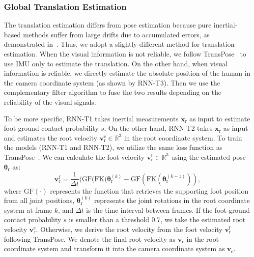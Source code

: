 \documentclass[sigconf,nonacm=true]{acmart}
\begin{document}
\subsubsection{Global Translation Estimation}\label{subsubsec:Tran}
The translation estimation differs from pose estimation because pure inertial-based methods suffer from large drifts due to accumulated errors, as demonstrated in~\cite{EgoLocate}.
Thus, we adopt a slightly different method for translation estimation.
When the visual information is not reliable, we follow TransPose~\cite{TransPose} to use IMU only to estimate the translation. 
On the other hand, when visual information is reliable, we directly estimate the absolute position of the human in the camera coordinate system (as shown by RNN-T3).
Then we use the complementary filter algorithm to fuse the two results depending on the reliability of the visual signals.
\par
To be more specific, RNN-T1 takes inertial measurements $\boldsymbol{x}_{\mathrm{r}}$ as input to estimate foot-ground contact probability $s$.
On the other hand, RNN-T2 takes $\boldsymbol{x}_{\mathrm{r}}$ as input and estimates the root velocity $\boldsymbol{{v}_{\mathrm{r}}^{\mathrm{e}}}\in\mathbb{R}^{3}$ in the root coordinate system.
To train the models (RNN-T1 and RNN-T2), we utilize the same loss function as TransPose~\cite{TransPose}.
We can calculate the foot velocity $\boldsymbol{v}_{\mathrm{r}}^\mathrm{f}\in\mathbb{R}^{3}$ using the estimated pose $\boldsymbol{\theta}_{\mathrm{r}}$ as:
\begin{equation}
\boldsymbol{v}_{\mathrm{r}}^\mathrm{f}=\frac{1}{\Delta t}(\mathrm{GF}(\mathrm{FK}(\boldsymbol{\theta}_{\mathrm{r}}^{(k)}-\mathrm{GF}(\mathrm{FK}(\boldsymbol{\theta}_{\mathrm{r}}^{(k-1)})),
\end{equation}
where $\mathrm{GF}(\cdot)$ represents the function that retrieves the supporting foot position from all joint positions, $\boldsymbol{\theta}_{\mathrm{r}}^{(k)}$ represents the joint rotations in the root coordinate system at frame $k$, and $\Delta t$ is the time interval between frames.
If the foot-ground contact probability $s$ is smaller than a threshold $0.7$, we take the estimated root velocity $\boldsymbol{{v}_{\mathrm{r}}^{\mathrm{e}}}$.
Otherwise, we derive the root velocity from the foot velocity $\boldsymbol{v}_{\mathrm{r}}^\mathrm{f}$ following TransPose.
We denote the final root velocity as  $\boldsymbol{{v}_{\mathrm{r}}}$ in the root coordinate system and transform it into the camera coordinate system as $\boldsymbol{{v}_{\mathrm{c}}}$.
\end{document}
